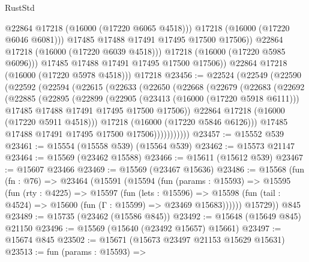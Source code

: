 \begin{lexlean}{RustStd}
\begin{coremodule}
                      @22864
                      @17218
                      (@16000 (@17220 @6065 @4518)))
                    @17218
                    (@16000 (@17220 @6046 @6081)))
                  @17485
                  @17488
                  @17491
                  @17495
                  @17500
                  @17506))
              @22864
              @17218
              (@16000 (@17220 @6039 @4518)))
            @17218
            (@16000 (@17220 @5985 @6096)))
          @17485
          @17488
          @17491
          @17495
          @17500
          @17506))
      @22864
      @17218
      (@16000 (@17220 @5978 @4518)))
    @17218
@23456 := @22524
    (@22549
      (@22590
        (@22592
          (@22594
            (@22615
              (@22633
                (@22650
                  (@22668
                    (@22679
                      (@22683
                        (@22692
                          (@22885
                            (@22895
                              (@22899
                                (@22905
                                  (@23413 (@16000 (@17220 @5918 @6111)))
                                  @17485
                                  @17488
                                  @17491
                                  @17495
                                  @17500
                                  @17506))
                              @22864
                              @17218
                              (@16000 (@17220 @5911 @4518)))
                            @17218
                            (@16000 (@17220 @5846 @6126)))
                          @17485
                          @17488
                          @17491
                          @17495
                          @17500
                          @17506)))))))))))
@23457 := @15552 @539
@23461 := @15554 (@15558 @539) (@15564 @539)
@23462 := @15573 @21147
@23464 := @15569 (@23462 @15588)
@23466 := @15611 (@15612 @539)
@23467 := @15607 @23466
@23469 := @15569 (@23467 @15636)
@23486 := @15568
    (fun (fn : @76) =>
    @23464
      (@15591
        (@15594
          (fun (params : @15593) =>
          @15595
            (fun (rty : @4225) =>
            @15597
              (fun (lets : @15596) =>
              @15598 (fun (tail : @4524) => @15600 (fun (Γ : @15599) => @23469 @15683))))))
        @15729))
    @845
@23489 := @15735 (@23462 (@15586 @845))
@23492 := @15648 (@15649 @845) @21150
@23496 := @15569 (@15640 (@23492 @15657) @15661)
@23497 := @15674 @845
@23502 := @15671 (@15673 @23497 @21153 @15629 @15631)
@23513 := fun (params : @15593) =>

\end{coremodule}
\end{lexlean}

